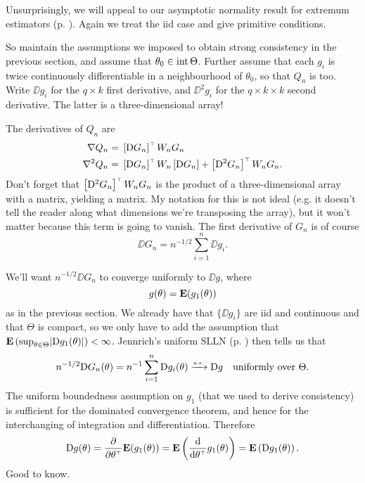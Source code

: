 \documentclass[11pt,letterpaper,reqno,oneside]{article}
\begin{document}
Unsurprisingly, we will appeal to our asymptotic normality result for extremum estimators (p. \pageref{proposition:asymptotic_normality}). Again we treat the iid case and give primitive conditions.

So maintain the assumptions we imposed to obtain strong consistency in the previous section, and assume that $\theta_0 \in \operatorname*{int} \Theta$. Further assume that each $g_i$ is twice continuously differentiable in a neighbourhood of $\theta_0$, so that $Q_n$ is too. Write $\DD g_i$ for the $q \times k$ first derivative, and $\DD^2 g_i$ for the $q \times k \times k$ second derivative. The latter is a three-dimensional array!


The derivatives of $Q_n$ are
%
\begin{align*}
	\nabla Q_n 
	={}& \left[ \mathrm{D} G_n \right]^{\scriptscriptstyle \top} W_n G_n
	\\
	\nabla^2 Q_n 
	={}& \left[ \mathrm{D} G_n \right]^{\scriptscriptstyle \top} W_n \left[ \mathrm{D} G_n \right]
	+ \left[ \mathrm{D}^2 G_n \right]^{\scriptscriptstyle \top} W_n G_n .
\end{align*}
%
Don't forget that $\left[ \mathrm{D}^2 G_n \right]^{\scriptscriptstyle \top} W_n G_n$ is the product of a three-dimensional array with a matrix, yielding a matrix. My notation for this is not ideal (e.g. it doesn't tell the reader along what dimensions we're transposing the array), but it won't matter because this term is going to vanish. The first derivative of $G_n$ is of course
%
\begin{equation*}
	\DD G_n
	= n^{-1/2} \sum_{i=1}^n \DD g_i .
\end{equation*}


We'll want $n^{-1/2} \DD G_n$ to converge uniformly to $\DD g$, where
%
\begin{equation*}
	g(\theta) = \mathbf{E}(g_1(\theta))
\end{equation*}
%
as in the previous section. We already have that $\{ \DD g_i \}$ are iid and continuous and that $\Theta$ is compact, so we only have to add the assumption that $\E\left( \sup_{\theta \in \Theta} \abs*{\DD g_1(\theta)} \right) < \infty$. Jennrich's uniform SLLN (p. \pageref{theorem:Jennrich_uniform_SLLN}) then tells us that
%
\begin{equation*}
	n^{-1/2} \mathrm{D} G_n(\theta)
	= n^{-1} \sum_{i=1}^n \mathrm{D} g_i(\theta)
	\xrightarrow{{\scriptscriptstyle \mathrm{a.s.}}} \mathrm{D} g
	\quad\text{uniformly over $\Theta$} .
\end{equation*}
%
The uniform boundedness assumption on $g_1$ (that we used to derive consistency) is sufficient for the dominated convergence theorem, and hence for the interchanging of integration and differentiation. Therefore
%
\begin{equation*}
	\mathrm{D} g(\theta)
	= \frac{\partial}{\partial \theta^{\scriptscriptstyle \top}} \mathbf{E}(g_1(\theta)) 
	= \mathbf{E}\left( \frac{\mathrm{d}}{\mathrm{d} \theta^{\scriptscriptstyle \top}} g_1(\theta) \right)
	= \mathbf{E}\left( \mathrm{D} g_1(\theta) \right) .
\end{equation*} 
%
Good to know.
\end{document}
